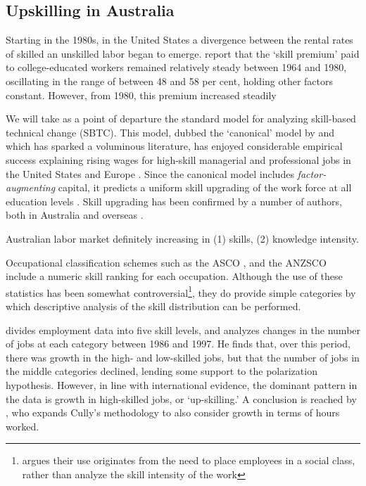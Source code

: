 

\subsection{Upskilling in Australia}

Starting in the 1980s, in the United States a divergence between the rental rates of skilled an unskilled labor began to emerge. \citet{Acemoglu2011} report that the `skill premium' paid to college-educated workers remained relatively steady between 1964 and 1980, oscillating in the range of between 48 and 58 per cent, holding other factors constant. However, from 1980, this premium increased steadily 

We will take as a point of departure the standard model for analyzing skill-based technical change (SBTC). This model, dubbed the `canonical' model by \citet{Acemoglu2011} and which has sparked a voluminous literature, has enjoyed considerable empirical success explaining rising wages for high-skill managerial and professional jobs in the United States and Europe \citep{Katz1992}. Since the canonical model includes \emph{factor-augmenting} capital, it predicts a uniform skill upgrading of the work force at all education levels \citep{Levy2003}. Skill upgrading has been confirmed by a number of authors, both in Australia \citep{Esposto2012, Wooden2000, Cully1999} and overseas \citep{Autor2008}. 

Australian labor market definitely increasing in (1) skills, (2) knowledge intensity. \citet{Esposto2012} \citet{Esposto2011}

Occupational classification schemes such as the ASCO \citep{Castles1986}, and the ANZSCO \citep{Trewin2006} include a numeric skill ranking for each occupation. Although the use of these statistics has been somewhat controversial\footnote{\citet{Cully1999} argues their use originates from the need to place employees in a social class, rather than analyze the skill intensity of the work}, they do provide simple categories by which descriptive analysis of the skill distribution can be performed. 

\citet{Cully1999} divides employment data into five skill levels, and analyzes changes in the number of jobs at each category between 1986 and 1997. He finds that, over this period, there was growth in the high- and low-skilled jobs, but that the number of jobs in the middle categories declined, lending some support to the polarization hypothesis. However, in line with international evidence, the dominant pattern in the data is growth in high-skilled jobs, or `up-skilling.' A conclusion is reached by \cite{Wooden2000}, who expands Cully's methodology to also consider growth in terms of hours worked. 

